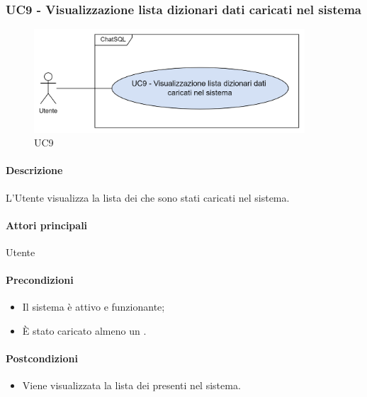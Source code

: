 
\subsubsection{UC9 - Visualizzazione lista dizionari dati caricati nel sistema}\label{UC9}

\begin{figure}[H]
  \centering
  \includegraphics[width=0.90\textwidth]{assets/uc9.png}
  \caption{UC9}
\end{figure}

\paragraph*{Descrizione}
L'Utente visualizza la lista dei  che sono stati caricati nel sistema.

\paragraph*{Attori principali}
Utente

\paragraph*{Precondizioni}
\begin{itemize}
  \item Il sistema è attivo e funzionante;
  \item È stato caricato almeno un .  
\end{itemize}

\paragraph*{Postcondizioni}
\begin{itemize}
\item Viene visualizzata la lista dei  presenti nel sistema.
\end{itemize}

